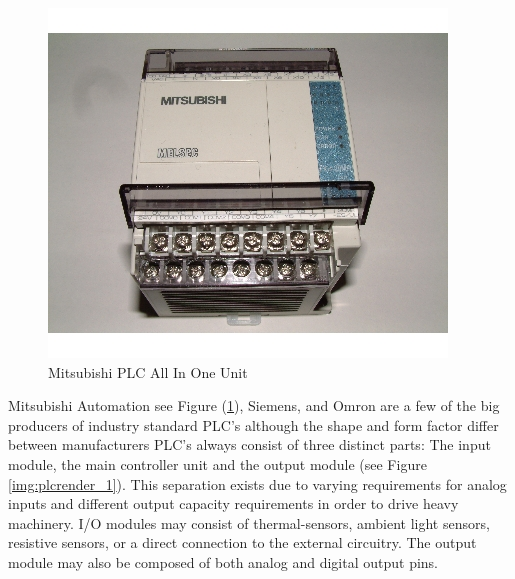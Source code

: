 \begin{figure}[htp]
    \centering
    \includegraphics[width=\imgsmlphoto]{./images/c01_mitsubishiplc.jpg}
    \caption{Mitsubishi PLC All In One Unit \cite{img_c01_MitsubishiPlc}}
    \label{img:mitsubishiplc}
\end{figure}
Mitsubishi Automation see Figure (\ref{img:mitsubishiplc}), Siemens, and Omron are a few of the big
 producers of industry standard PLC's although the shape and form factor differ between 
 manufacturers PLC's always consist of three distinct parts:  The input module, the main 
 controller unit and the output module (see Figure \ref{img:plcrender_1}). 
 This separation exists due to varying requirements for analog inputs and different output 
 capacity requirements in order to drive heavy machinery. I/O modules may consist of 
 thermal-sensors, ambient light sensors, resistive sensors, or a direct connection to the 
 external circuitry. The output module may also be composed of both analog and digital output pins.
 
